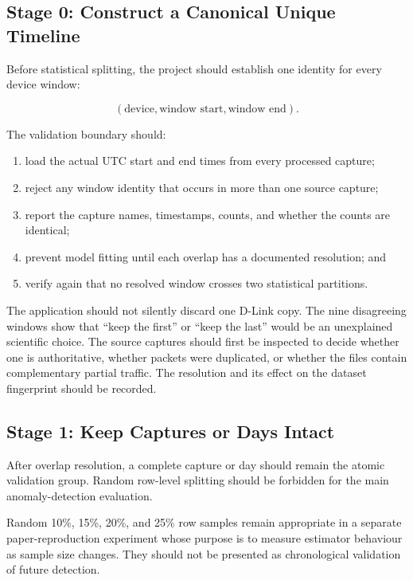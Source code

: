 \documentclass[11pt,a4paper]{article}
\begin{document}
\subsection{Stage 0: Construct a Canonical Unique Timeline}

Before statistical splitting, the project should establish one identity for
every device window:

\[
(\text{device},\text{window start},\text{window end}).
\]

The validation boundary should:

\begin{enumerate}

\item load the actual UTC start and end times from every processed capture;

\item reject any window identity that occurs in more than one source capture;

\item report the capture names, timestamps, counts, and whether the counts are
identical;

\item prevent model fitting until each overlap has a documented resolution;
and

\item verify again that no resolved window crosses two statistical partitions.

\end{enumerate}

The application should not silently discard one D-Link copy. The nine
disagreeing windows show that ``keep the first'' or ``keep the last'' would be
an unexplained scientific choice. The source captures should first be inspected
to decide whether one is authoritative, whether packets were duplicated, or
whether the files contain complementary partial traffic. The resolution and
its effect on the dataset fingerprint should be recorded.

\subsection{Stage 1: Keep Captures or Days Intact}

After overlap resolution, a complete capture or day should remain the atomic
validation group. Random row-level splitting should be forbidden for the main
anomaly-detection evaluation.

Random 10\%, 15\%, 20\%, and 25\% row samples remain appropriate in a separate
paper-reproduction experiment whose purpose is to measure estimator behaviour
as sample size changes. They should not be presented as chronological
validation of future detection.
\end{document}
